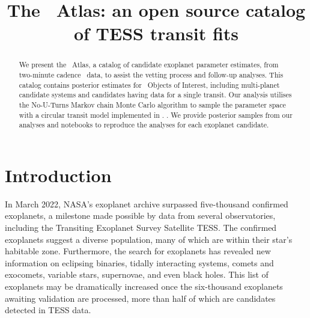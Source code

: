 \documentclass[floatfix,ApJL,twocolumn]{aastex631}
\begin{document}
\title{The \tess\ Atlas: an open source catalog of TESS transit fits}












\begin{abstract}
We present the \tess\ Atlas, a catalog of candidate exoplanet parameter estimates, from two-minute cadence \tess\  data, to assist the vetting process and follow-up analyses.
This catalog contains posterior estimates for \red{\numAnalysed} \tess\ Objects of Interest, including \red{\numAnalysedMulti} multi-planet candidate systems and \red{\numAnalysedSingle} candidates having data for a single transit.
Our analysis utilises the No-U-Turns Markov chain Monte Carlo algorithm to sample the parameter space with a circular transit model implemented in \exoplanet.
.
We provide posterior samples from our analyses and \jupyter notebooks to reproduce the analyses for each exoplanet candidate.
\end{abstract}




\section{Introduction} \label{sec:intro}


In March 2022, NASA's exoplanet archive surpassed five-thousand confirmed exoplanets, a milestone made possible by data from several observatories, including the Transiting Exoplanet Survey Satellite TESS.
The confirmed exoplanets suggest a diverse population, many of which are within their star's habitable zone.
Furthermore, the search for exoplanets has revealed new information on eclipsing binaries, tidally interacting systems,  comets and exocomets, variable stars, supernovae, and even black holes.
This list of exoplanets may be dramatically increased once the six-thousand exoplanets awaiting validation are processed, more than half of which are candidates detected in TESS data.
\end{document}
